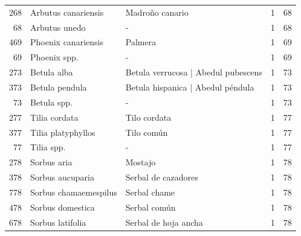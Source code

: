 \begin{longtable}{r p{4cm} p{5cm} c c}
    268           & Arbutus canariensis               & Madroño canario                               & 1             & 68             \\
    68            & Arbutus unedo                     & -                                             & 1             & 68             \\
    469           & Phoenix canariensis               & Palmera                                       & 1             & 69             \\
    69            & Phoenix spp.                      & -                                             & 1             & 69             \\
    273           & Betula alba                       & Betula verrucosa | Abedul pubescens           & 1             & 73             \\
    373           & Betula pendula                    & Betula hispanica | Abedul péndula             & 1             & 73             \\
    73            & Betula spp.                       & -                                             & 1             & 73             \\
    277           & Tilia cordata                     & Tilo cordata                                  & 1             & 77             \\
    377           & Tilia platyphyllos                & Tilo común                                    & 1             & 77             \\
    77            & Tilia spp.                        & -                                             & 1             & 77             \\
    278           & Sorbus aria                       & Mostajo                                       & 1             & 78             \\
    378           & Sorbus aucuparia                  & Serbal de cazadores                           & 1             & 78             \\
    778           & Sorbus chamaemespilus             & Serbal chame                                  & 1             & 78             \\
    478           & Sorbus domestica                  & Serbal común                                  & 1             & 78             \\
    678           & Sorbus latifolia                  & Serbal de hoja ancha                          & 1             & 78             \\

\end{longtable}
